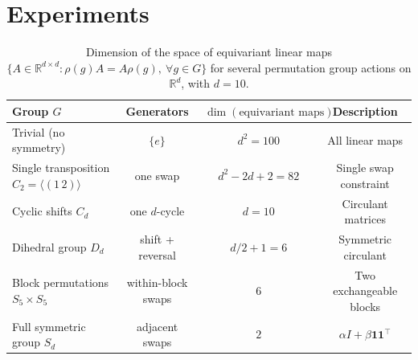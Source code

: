 \documentclass[11pt]{article}
\theoremstyle{plain}
\theoremstyle{definition}
\theoremstyle{remark}
\begin{document}


 



 
\section{Experiments}
\label{sec:experiments}

\begin{table}[t]
\centering
\caption{Dimension of the space of equivariant linear maps
\(\{A\in\mathbb{R}^{d\times d}:\rho(g)A=A\rho(g),\ \forall g\in G\}\)
for several permutation group actions on \(\mathbb{R}^d\), with \(d=10\).}
\label{tab:equivariant_dimensions}
\begin{tabular}{lccc}
\toprule
Group \(G\) &
Generators &
\(\dim(\text{equivariant maps})\) &
Description \\
\midrule
Trivial (no symmetry)
& \(\{e\}\)
& \(d^2=100\)
& All linear maps \\

Single transposition \(C_2=\langle(1\,2)\rangle\)
& one swap
& \(d^2-2d+2=82\)
& Single swap constraint \\

Cyclic shifts \(C_d\)
& one \(d\)-cycle
& \(d=10\)
& Circulant matrices \\

Dihedral group \(D_d\)
& shift + reversal
& \(d/2+1=6\)
& Symmetric circulant \\

Block permutations \(S_5\times S_5\)
& within-block swaps
& \(6\)
& Two exchangeable blocks \\

Full symmetric group \(S_d\)
& adjacent swaps
& \(2\)
& \(\alpha I+\beta\mathbf{1}\mathbf{1}^\top\) \\
\bottomrule
\end{tabular}
\end{table}
\end{document}
